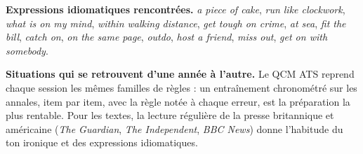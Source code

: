 \documentclass[11pt,a4paper]{article}
\begin{document}
\textbf{Expressions idiomatiques rencontrées.} \emph{a piece of cake}, \emph{run like clockwork}, \emph{what is on my mind}, \emph{within walking distance}, \emph{get tough on crime}, \emph{at sea}, \emph{fit the bill}, \emph{catch on}, \emph{on the same page}, \emph{outdo}, \emph{host a friend}, \emph{miss out}, \emph{get on with somebody}.

\textbf{Situations qui se retrouvent d'une année à l'autre.} Le QCM ATS reprend chaque session les mêmes familles de règles : un entraînement chronométré sur les annales, item par item, avec la règle notée à chaque erreur, est la préparation la plus rentable. Pour les textes, la lecture régulière de la presse britannique et américaine (\emph{The Guardian}, \emph{The Independent}, \emph{BBC News}) donne l'habitude du ton ironique et des expressions idiomatiques.
\end{document}
